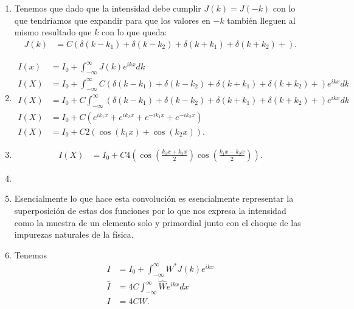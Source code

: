 \documentclass{report}
\begin{document}
\begin{enumerate}
  \item Tenemos que dado que la intensidad debe cumplir $J\left( k \right) = J\left( -k \right) $ con lo que tendríamos que expandir para que los valores en $-k$ también lleguen al mismo resultado que $k$ con lo que queda:
    \begin{align*}
      J\left( k \right) &= C\left( \delta\left( k - k_1 \right) +\delta\left( k - k_2 \right) +\delta\left( k + k_1 \right) +\delta\left( k + k_2 \right) + \right) 
    .\end{align*}

  \item 
    \begin{align*}
      I\left( x \right) &= I_0 + \int_{-\infty}^{\infty} J\left( k \right) e^{ikx}dk \\
      I\left( X \right) &= I_0 + \int_{-\infty}^{\infty} C\left( \delta\left( k - k_1 \right) +\delta\left( k - k_2 \right) +\delta\left( k + k_1 \right) +\delta\left( k + k_2 \right) + \right) e^{ikx}dk\\
      I\left( X \right) &= I_0 + C\int_{-\infty}^{\infty} \left( \delta\left( k - k_1 \right) +\delta\left( k - k_2 \right) +\delta\left( k + k_1 \right) +\delta\left( k + k_2 \right) + \right) e^{ikx}dk\\
      I\left( X \right) &= I_0 + C\left( e^{ik_1x} + e^{ik_2x} +e^{-ik_1x} +e^{-ik_2x} \right)\\
      I\left( X \right) &= I_0 + C2\left( \cos\left( k_1 x \right) + \cos\left( k_2 x \right)  \right).
    \end{align*}
   \item 
    \begin{align*}
      I\left( X \right) &= I_0 + C 4\left( \cos\left( \frac{k_1x + k_2x}{2} \right) \cos\left( \frac{k_1x - k_2x}{2} \right) \right)
    .\end{align*}
    \item
    \item Esencialmente lo que hace esta convolución es esencialmente representar la superposición de estas dos funciones por lo que nos expresa la intensidad como la muestra de un elemento solo y primordial junto con el choque de las impurezas naturales de la física.
    \item Tenemos
      \begin{align*}
        I &= I_0 + \int_{-\infty}^{\infty}W^{*}J\left( k \right) e^{ikx} \\
	\hat{I} &= 4C\int_{-\infty}^{\infty} \hat{W} e^{ikx} dx\\
	I &= 4CW
      .\end{align*}
\end{enumerate}
\end{document}
